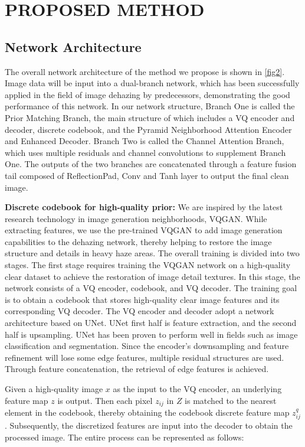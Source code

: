 \documentclass[lettersize,journal]{IEEEtran}
\begin{document}
\section{PROPOSED METHOD}
\subsection{Network Architecture}
The overall network architecture of the method we propose is shown in \ref{fig2}. Image data will be input into a dual-branch network, which has been successfully applied in the field of image dehazing by predecessors, demonstrating the good performance of this network. In our network structure, Branch One is called the Prior Matching Branch, the main structure of which includes a VQ encoder and decoder, discrete codebook, and the Pyramid Neighborhood Attention Encoder and Enhanced Decoder. Branch Two is called the Channel Attention Branch, which uses multiple residuals and channel convolutions to supplement Branch One. The outputs of the two branches are concatenated through a feature fusion tail composed of ReflectionPad, Conv and Tanh layer to output the final clean image.


{\bf{Discrete codebook for high-quality prior:}}
We are inspired by the latest research technology in image generation neighborhoods, VQGAN\cite{esser2021taming}. While extracting features, we use the pre-trained VQGAN to add image generation capabilities to the dehazing network, thereby helping to restore the image structure and details in heavy haze areas. The overall training is divided into two stages. The first stage requires training the VQGAN network on a high-quality clear dataset to achieve the restoration of image detail textures. In this stage, the network consists of a VQ encoder, codebook, and VQ decoder. The training goal is to obtain a codebook that stores high-quality clear image features and its corresponding VQ decoder. The VQ encoder and decoder adopt a network architecture based on UNet\cite{ronneberger2015u}. UNet first half is feature extraction, and the second half is upsampling. UNet has been proven to perform well in fields such as image classification and segmentation. Since the encoder's downsampling and feature refinement will lose some edge features, multiple residual structures are used. Through feature concatenation, the retrieval of edge features is achieved.

Given a high-quality image $x$ as the input to the VQ encoder, an underlying feature map $z$ is output. Then each pixel $z_{ij}$ in $Z$ is matched to the nearest element in the codebook, thereby obtaining the codebook discrete feature map $z^{q}_{ij}$. Subsequently, the discretized features are input into the decoder to obtain the processed image. The entire process can be represented as follows:
\end{document}
